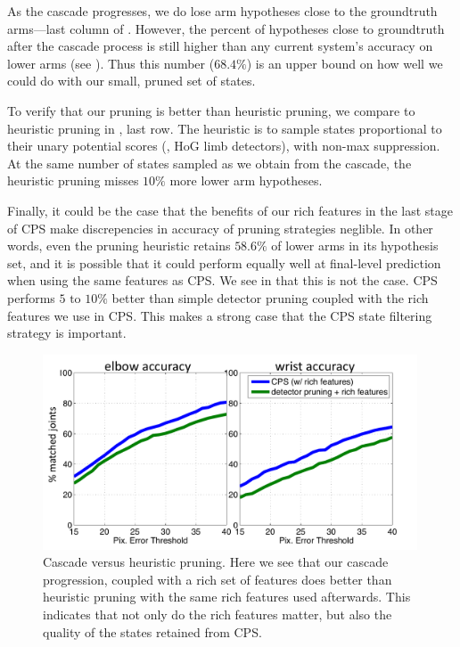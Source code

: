 As the cascade progresses, we do lose arm hypotheses close to the groundtruth 
arms---last column of .  However, the percent of hypotheses close 
to groundtruth after the cascade process is still higher than any current 
system's accuracy on lower arms (see ).  Thus this number 
($68.4 \%$) is an upper bound on how well we could do with our small, pruned 
set of states.

To verify that our pruning is better than heuristic pruning, we compare to 
heuristic pruning in , last row.  The heuristic is to sample states 
proportional to their unary potential scores (\ie, HoG limb detectors), with 
non-max suppression.  At the same number of states sampled as we obtain from 
the cascade, the heuristic pruning misses $10\%$ more lower arm hypotheses.

Finally, it could be the case that the benefits of our rich features in the 
last stage of CPS make discrepencies in accuracy of pruning strategies 
neglible.  In other words, even the pruning heuristic retains $58.6\%$ of lower 
arms in its hypothesis set, and it is possible that it could perform equally 
well at final-level prediction when using the same features as CPS.  We see in 
 that this is not the case.  CPS performs $5 \text{ 
to } 10\%$ better than simple detector pruning coupled with the rich features 
we use in CPS.  This makes a strong case that the CPS state filtering strategy 
is important.

\begin{figure}[tb]
\begin{center}
\includegraphics[width=0.99\textwidth]{figs/cascade-vs-pruning.pdf}
\caption[Cascade versus heuristic pruning.]{Cascade versus heuristic pruning.  
Here we see that our cascade progression, coupled with a rich set of features 
does better than heuristic pruning with the same rich features used afterwards.  
This indicates that not only do the rich features matter, but also the quality 
of the states retained from CPS.}
\label{fig:cascade-vs-pruning}
\end{center}
\end{figure}


